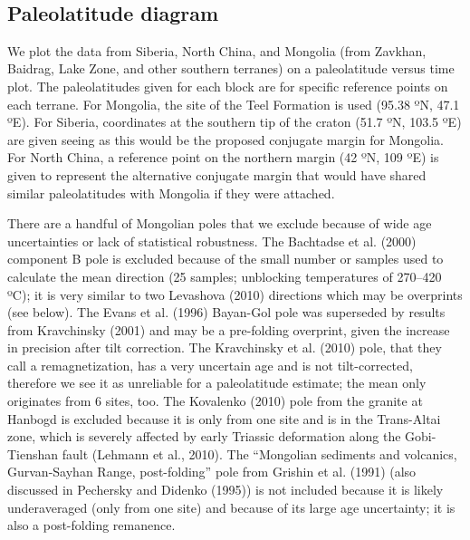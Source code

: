 \documentclass[11pt]{article}
\begin{document}
    \begin{center}
    \end{center}
    { \hspace*{\fill} \\}
    
    \subsection{Paleolatitude diagram}\label{paleolatitude-diagram}

    We plot the data from Siberia, North China, and Mongolia (from Zavkhan,
Baidrag, Lake Zone, and other southern terranes) on a paleolatitude
versus time plot. The paleolatitudes given for each block are for
specific reference points on each terrane. For Mongolia, the site of the
Teel Formation is used (95.38 ºN, 47.1 ºE). For Siberia, coordinates at
the southern tip of the craton (51.7 ºN, 103.5 ºE) are given seeing as
this would be the proposed conjugate margin for Mongolia. For North
China, a reference point on the northern margin (42 ºN, 109 ºE) is given
to represent the alternative conjugate margin that would have shared
similar paleolatitudes with Mongolia if they were attached.

    There are a handful of Mongolian poles that we exclude because of wide
age uncertainties or lack of statistical robustness. The Bachtadse et
al. (2000) component B pole is excluded because of the small number or
samples used to calculate the mean direction (25 samples; unblocking
temperatures of 270--420 ºC); it is very similar to two Levashova (2010)
directions which may be overprints (see below). The Evans et al. (1996)
Bayan-Gol pole was superseded by results from Kravchinsky (2001) and may
be a pre-folding overprint, given the increase in precision after tilt
correction. The Kravchinsky et al. (2010) pole, that they call a
remagnetization, has a very uncertain age and is not tilt-corrected,
therefore we see it as unreliable for a paleolatitude estimate; the mean
only originates from 6 sites, too. The Kovalenko (2010) pole from the
granite at Hanbogd is excluded because it is only from one site and is
in the Trans-Altai zone, which is severely affected by early Triassic
deformation along the Gobi-Tienshan fault (Lehmann et al., 2010). The
``Mongolian sediments and volcanics, Gurvan-Sayhan Range, post-folding''
pole from Grishin et al. (1991) (also discussed in Pechersky and Didenko
(1995)) is not included because it is likely underaveraged (only from
one site) and because of its large age uncertainty; it is also a
post-folding remanence.
\end{document}
